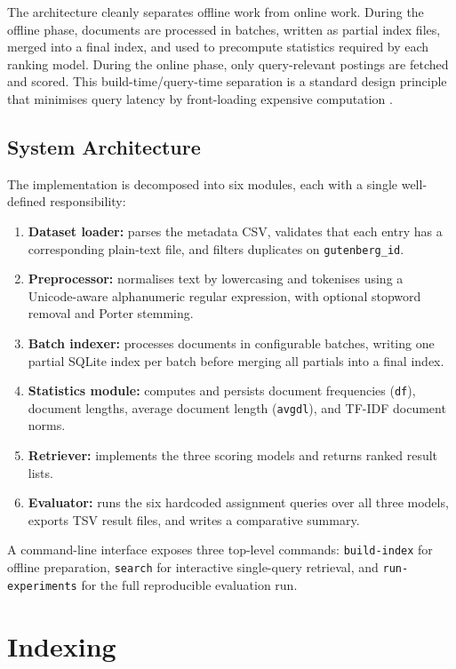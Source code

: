 \documentclass[sigconf]{acmart}
\begin{document}
The architecture cleanly separates offline work from online work. During the offline phase, documents are processed in batches, written as partial index files, merged into a final index, and used to precompute statistics required by each ranking model. During the online phase, only query-relevant postings are fetched and scored. This build-time/query-time separation is a standard design principle that minimises query latency by front-loading expensive computation \cite{manning2008}.

\subsection{System Architecture}

The implementation is decomposed into six modules, each with a single well-defined responsibility:

\begin{enumerate}
    \item \textbf{Dataset loader:} parses the metadata CSV, validates that each entry has a corresponding plain-text file, and filters duplicates on \texttt{gutenberg\_id}.
    \item \textbf{Preprocessor:} normalises text by lowercasing and tokenises using a Unicode-aware alphanumeric regular expression, with optional stopword removal and Porter stemming.
    \item \textbf{Batch indexer:} processes documents in configurable batches, writing one partial SQLite index per batch before merging all partials into a final index.
    \item \textbf{Statistics module:} computes and persists document frequencies (\texttt{df}), document lengths, average document length (\texttt{avgdl}), and TF-IDF document norms.
    \item \textbf{Retriever:} implements the three scoring models and returns ranked result lists.
    \item \textbf{Evaluator:} runs the six hardcoded assignment queries over all three models, exports TSV result files, and writes a comparative summary.
\end{enumerate}

A command-line interface exposes three top-level commands: \texttt{build-index} for offline preparation, \texttt{search} for interactive single-query retrieval, and \texttt{run-experiments} for the full reproducible evaluation run.

\section{Indexing}
\end{document}
